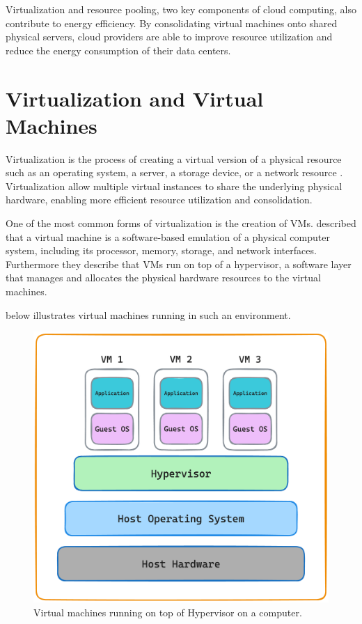 \documentclass[
  table]{report}
\begin{document}
Virtualization and resource pooling, two key components of cloud
computing, also contribute to energy efficiency. By consolidating
virtual machines onto shared physical servers, cloud providers are able
to improve resource utilization and reduce the energy consumption of
their data centers. \citep{beloglazovEnergyawareResourceAllocation2012}

\section{Virtualization and Virtual Machines}
\label{sect:virtual}

Virtualization is the process of creating a virtual version of a
physical resource such as an operating system, a server, a storage
device, or a network resource
\citep{chiuehSurveyVirtualizationTechnologies2005}. Virtualization allow
multiple virtual instances to share the underlying physical hardware,
enabling more efficient resource utilization and consolidation.

One of the most common forms of virtualization is the creation of
\ac{VMs}. \citet{barhamXenArtVirtualization2003} described that a
virtual machine is a software-based emulation of a physical computer
system, including its processor, memory, storage, and network
interfaces. Furthermore they describe that \ac{VMs} run on top of a
hypervisor, a software layer that manages and allocates the physical
hardware resources to the virtual machines.

 below illustrates virtual machines running in such an
environment.

\begin{figure}[H]
\centering
  \includegraphics[width=0.7\columnwidth]{assets/3.2-vm-figure.png}
  \caption{Virtual machines running on top of Hypervisor on a computer.}
  \label{vm-figure}
\end{figure}
\end{document}
